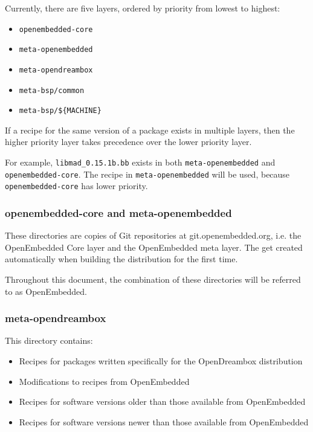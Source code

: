 \documentclass[a4paper]{article}
\newcommand{\shell}[1]{\texttt{\small #1}}
\begin{document}
    Currently, there are five layers, ordered by priority from lowest to
    highest:

    \begin{itemize}
      \item \shell{openembedded-core}
      \item \shell{meta-openembedded}
      \item \shell{meta-opendreambox}
      \item \shell{meta-bsp/common}
      \item \shell{meta-bsp/\$\{MACHINE\}}
    \end{itemize}

    If a recipe for the same version of a package exists in multiple layers,
    then the higher priority layer takes precedence over the lower priority
    layer.

    For example, \shell{libmad\_0.15.1b.bb} exists in both
    \shell{meta-openembedded} and \shell{openembedded-core}. The recipe in
    \shell{meta-openembedded} will be used, because \shell{openembedded-core}
    has lower priority.

    \subsubsection{openembedded-core and meta-openembedded}
       These directories are copies of Git repositories at git.openembedded.org, i.e.
       the OpenEmbedded Core layer and the OpenEmbedded meta layer. The get created
       automatically when building the distribution for the first time.

       Throughout this document, the combination of these directories will be
       referred to as OpenEmbedded.

    \subsubsection{meta-opendreambox}
      This directory contains:

      \begin{itemize}
        \item Recipes for packages written specifically for the OpenDreambox distribution
        \item Modifications to recipes from OpenEmbedded
        \item Recipes for software versions older than those available from OpenEmbedded
        \item Recipes for software versions newer than those available from OpenEmbedded
      \end{itemize}
\end{document}
